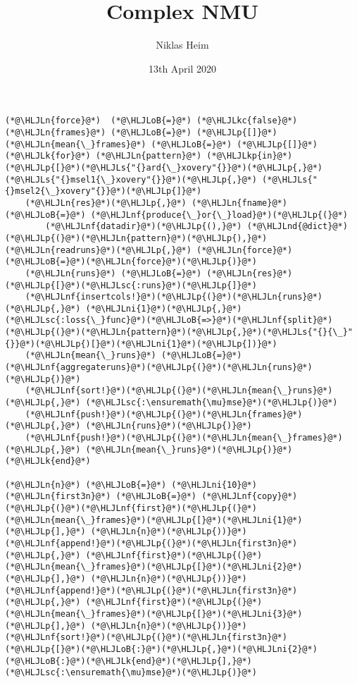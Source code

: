 \documentclass[12pt,a4paper]{article}
\title{ Complex NMU }
\author{ Niklas Heim }
\date{ 13th April 2020 }
\newcommand{\HLJLk}[1]{\textcolor[RGB]{148,91,176}{\textbf{#1}}}
\newcommand{\HLJLkc}[1]{\textcolor[RGB]{59,151,46}{\textit{#1}}}
\newcommand{\HLJLkp}[1]{\textcolor[RGB]{148,91,176}{\textbf{#1}}}
\newcommand{\HLJLn}[1]{#1}
\newcommand{\HLJLnd}[1]{\textcolor[RGB]{214,102,97}{#1}}
\newcommand{\HLJLnf}[1]{\textcolor[RGB]{66,102,213}{#1}}
\newcommand{\HLJLs}[1]{\textcolor[RGB]{201,61,57}{#1}}
\newcommand{\HLJLsc}[1]{\textcolor[RGB]{201,61,57}{#1}}
\newcommand{\HLJLni}[1]{\textcolor[RGB]{59,151,46}{#1}}
\newcommand{\HLJLoB}[1]{\textcolor[RGB]{102,102,102}{\textbf{#1}}}
\newcommand{\HLJLp}[1]{#1}
\begin{document}
\maketitle



\begin{lstlisting}
(*@\HLJLn{force}@*)  (*@\HLJLoB{=}@*) (*@\HLJLkc{false}@*)
(*@\HLJLn{frames}@*) (*@\HLJLoB{=}@*) (*@\HLJLp{[]}@*)
(*@\HLJLn{mean{\_}frames}@*) (*@\HLJLoB{=}@*) (*@\HLJLp{[]}@*)
(*@\HLJLk{for}@*) (*@\HLJLn{pattern}@*) (*@\HLJLkp{in}@*) (*@\HLJLp{[}@*)(*@\HLJLs{"{}ard{\_}xovery"{}}@*)(*@\HLJLp{,}@*) (*@\HLJLs{"{}msel1{\_}xovery"{}}@*)(*@\HLJLp{,}@*) (*@\HLJLs{"{}msel2{\_}xovery"{}}@*)(*@\HLJLp{]}@*)
    (*@\HLJLn{res}@*)(*@\HLJLp{,}@*) (*@\HLJLn{fname}@*) (*@\HLJLoB{=}@*) (*@\HLJLnf{produce{\_}or{\_}load}@*)(*@\HLJLp{(}@*)
        (*@\HLJLnf{datadir}@*)(*@\HLJLp{(),}@*) (*@\HLJLnd{@dict}@*)(*@\HLJLp{(}@*)(*@\HLJLn{pattern}@*)(*@\HLJLp{),}@*) (*@\HLJLn{readruns}@*)(*@\HLJLp{,}@*) (*@\HLJLn{force}@*)(*@\HLJLoB{=}@*)(*@\HLJLn{force}@*)(*@\HLJLp{)}@*)
    (*@\HLJLn{runs}@*) (*@\HLJLoB{=}@*) (*@\HLJLn{res}@*)(*@\HLJLp{[}@*)(*@\HLJLsc{:runs}@*)(*@\HLJLp{]}@*)
    (*@\HLJLnf{insertcols!}@*)(*@\HLJLp{(}@*)(*@\HLJLn{runs}@*)(*@\HLJLp{,}@*) (*@\HLJLni{1}@*)(*@\HLJLp{,}@*) (*@\HLJLsc{:loss{\_}func}@*)(*@\HLJLoB{=>}@*)(*@\HLJLnf{split}@*)(*@\HLJLp{(}@*)(*@\HLJLn{pattern}@*)(*@\HLJLp{,}@*)(*@\HLJLs{"{}{\_}"{}}@*)(*@\HLJLp{)[}@*)(*@\HLJLni{1}@*)(*@\HLJLp{])}@*)
    (*@\HLJLn{mean{\_}runs}@*) (*@\HLJLoB{=}@*) (*@\HLJLnf{aggregateruns}@*)(*@\HLJLp{(}@*)(*@\HLJLn{runs}@*)(*@\HLJLp{)}@*)
    (*@\HLJLnf{sort!}@*)(*@\HLJLp{(}@*)(*@\HLJLn{mean{\_}runs}@*)(*@\HLJLp{,}@*) (*@\HLJLsc{:\ensuremath{\mu}mse}@*)(*@\HLJLp{)}@*)
    (*@\HLJLnf{push!}@*)(*@\HLJLp{(}@*)(*@\HLJLn{frames}@*)(*@\HLJLp{,}@*) (*@\HLJLn{runs}@*)(*@\HLJLp{)}@*)
    (*@\HLJLnf{push!}@*)(*@\HLJLp{(}@*)(*@\HLJLn{mean{\_}frames}@*)(*@\HLJLp{,}@*) (*@\HLJLn{mean{\_}runs}@*)(*@\HLJLp{)}@*)
(*@\HLJLk{end}@*)

(*@\HLJLn{n}@*) (*@\HLJLoB{=}@*) (*@\HLJLni{10}@*)
(*@\HLJLn{first3n}@*) (*@\HLJLoB{=}@*) (*@\HLJLnf{copy}@*)(*@\HLJLp{(}@*)(*@\HLJLnf{first}@*)(*@\HLJLp{(}@*)(*@\HLJLn{mean{\_}frames}@*)(*@\HLJLp{[}@*)(*@\HLJLni{1}@*)(*@\HLJLp{],}@*) (*@\HLJLn{n}@*)(*@\HLJLp{))}@*)
(*@\HLJLnf{append!}@*)(*@\HLJLp{(}@*)(*@\HLJLn{first3n}@*)(*@\HLJLp{,}@*) (*@\HLJLnf{first}@*)(*@\HLJLp{(}@*)(*@\HLJLn{mean{\_}frames}@*)(*@\HLJLp{[}@*)(*@\HLJLni{2}@*)(*@\HLJLp{],}@*) (*@\HLJLn{n}@*)(*@\HLJLp{))}@*)
(*@\HLJLnf{append!}@*)(*@\HLJLp{(}@*)(*@\HLJLn{first3n}@*)(*@\HLJLp{,}@*) (*@\HLJLnf{first}@*)(*@\HLJLp{(}@*)(*@\HLJLn{mean{\_}frames}@*)(*@\HLJLp{[}@*)(*@\HLJLni{3}@*)(*@\HLJLp{],}@*) (*@\HLJLn{n}@*)(*@\HLJLp{))}@*)
(*@\HLJLnf{sort!}@*)(*@\HLJLp{(}@*)(*@\HLJLn{first3n}@*)(*@\HLJLp{[}@*)(*@\HLJLoB{:}@*)(*@\HLJLp{,}@*)(*@\HLJLni{2}@*)(*@\HLJLoB{:}@*)(*@\HLJLk{end}@*)(*@\HLJLp{],}@*) (*@\HLJLsc{:\ensuremath{\mu}mse}@*)(*@\HLJLp{)}@*)
\end{lstlisting}
\end{document}
